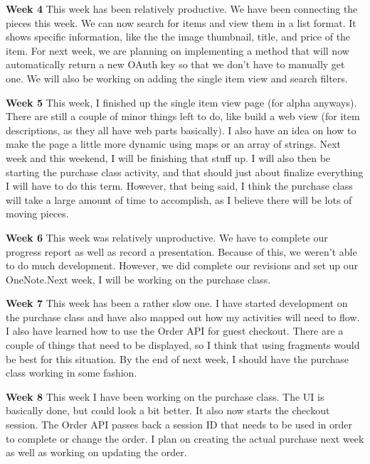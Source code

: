 \documentclass[journal,compsoc, 10pt, draftclsnofoot, onecolumn]{IEEEtran}
\begin{document}
\textbf{Week 4}\newline
This week has been relatively productive. We have been connecting the pieces this week. We can
now search for items and view them in a list format. It shows specific information, like the
the image thumbnail, title, and price of the item. For next week, we are planning on
implementing a method that will now automatically return a new OAuth key so that we don't have
to manually get one. We will also be working on adding the single item view and search
filters.\newline

\textbf{Week 5}\newline
This week, I finished up the single item view page (for alpha anyways). There are still a
couple of minor things left to do, like build a web view (for item descriptions, as they all
have web parts basically). I also have an idea on how to make the page a little more dynamic
using maps or an array of strings. Next week and this weekend, I will be finishing that stuff
up. I will also then be starting the purchase class activity, and that should just about
finalize everything I will have to do this term. However, that being said, I think the purchase 
class will take a large amount of time to accomplish, as I believe there will be lots of moving
pieces.\newline

\textbf{Week 6}\newline
This week was relatively unproductive. We have to complete our progress report as well as
record a presentation. Because of this, we weren't able to do much development. However, we did 
complete our revisions and set up our OneNote.Next week, I will be working on the purchase
class.\newline

\textbf{Week 7}\newline
This week has been a rather slow one. I have started development on the purchase class and have 
also mapped out how my activities will need to flow. I also have learned how to use the Order
API for guest checkout. There are a couple of things that need to be displayed, so I think that 
using fragments would be best for this situation. By the end of next week, I should have the
purchase class working in some fashion.\newline

\textbf{Week 8}\newline
This week I have been working on the purchase class. The UI is basically done, but could look a 
bit better. It also now starts the checkout session. The Order API passes back a session ID
that needs to be used in order to complete or change the order. I plan on creating the actual
purchase next week as well as working on updating the order.\newline
\end{document}
